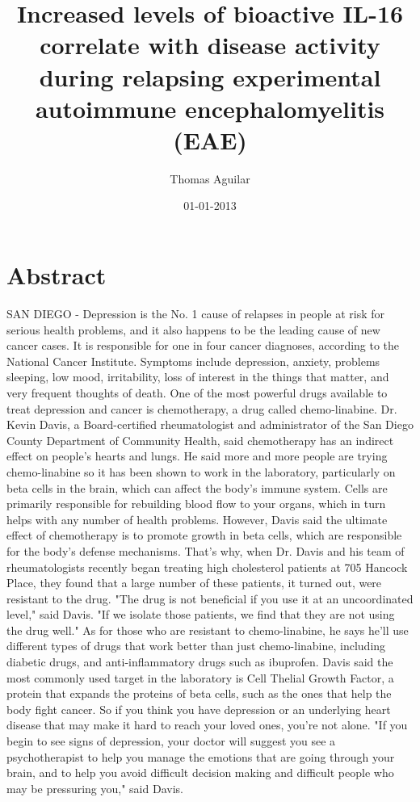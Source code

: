 \documentclass{article}%
\title{Increased levels of bioactive IL{-}16 correlate with disease activity during relapsing experimental autoimmune encephalomyelitis (EAE)}%
\author{Thomas Aguilar}%
\affil{Department of Biochemistry, Osmania University, Hyderabad, A.P., India}%
\date{01{-}01{-}2013}%
\begin{document}
%
\normalsize%
\maketitle%
\section{Abstract}%
\label{sec:Abstract}%
SAN DIEGO {-} Depression is the No. 1 cause of relapses in people at risk for serious health problems, and it also happens to be the leading cause of new cancer cases. It is responsible for one in four cancer diagnoses, according to the National Cancer Institute.\newline%
Symptoms include depression, anxiety, problems sleeping, low mood, irritability, loss of interest in the things that matter, and very frequent thoughts of death.\newline%
One of the most powerful drugs available to treat depression and cancer is chemotherapy, a drug called chemo{-}linabine.\newline%
Dr. Kevin Davis, a Board{-}certified rheumatologist and administrator of the San Diego County Department of Community Health, said chemotherapy has an indirect effect on people's hearts and lungs. He said more and more people are trying chemo{-}linabine so it has been shown to work in the laboratory, particularly on beta cells in the brain, which can affect the body's immune system.\newline%
Cells are primarily responsible for rebuilding blood flow to your organs, which in turn helps with any number of health problems.\newline%
However, Davis said the ultimate effect of chemotherapy is to promote growth in beta cells, which are responsible for the body's defense mechanisms.\newline%
That's why, when Dr. Davis and his team of rheumatologists recently began treating high cholesterol patients at 705 Hancock Place, they found that a large number of these patients, it turned out, were resistant to the drug.\newline%
"The drug is not beneficial if you use it at an uncoordinated level," said Davis. "If we isolate those patients, we find that they are not using the drug well."\newline%
As for those who are resistant to chemo{-}linabine, he says he'll use different types of drugs that work better than just chemo{-}linabine, including diabetic drugs, and anti{-}inflammatory drugs such as ibuprofen.\newline%
Davis said the most commonly used target in the laboratory is Cell Thelial Growth Factor, a protein that expands the proteins of beta cells, such as the ones that help the body fight cancer.\newline%
So if you think you have depression or an underlying heart disease that may make it hard to reach your loved ones, you're not alone.\newline%
"If you begin to see signs of depression, your doctor will suggest you see a psychotherapist to help you manage the emotions that are going through your brain, and to help you avoid difficult decision making and difficult people who may be pressuring you," said Davis.
\end{document}

